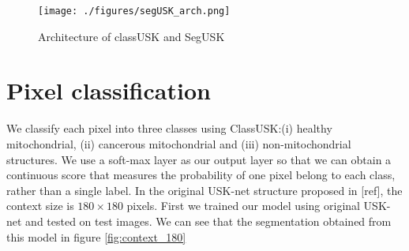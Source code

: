 \begin{figure}[ht!]
\texttt{[image: ./figures/segUSK\_arch.png]}
\caption{Architecture of classUSK and SegUSK }
\label{fig:classUSK}
\end{figure}


\section{Pixel classification}
We classify each pixel into three classes using ClassUSK:(i) healthy mitochondrial,
(ii) cancerous mitochondrial and (iii) non-mitochondrial structures. We use a
soft-max layer as our output layer so that we can obtain a continuous score that
measures the probability of one pixel belong to each class, rather than a single label.
In the original USK-net structure proposed in [ref], the context
size is $180 \times 180$  pixels. First we trained our model using original USK-net and tested on test images. We can see that the segmentation obtained from this model in figure \ref{fig:context_180}


